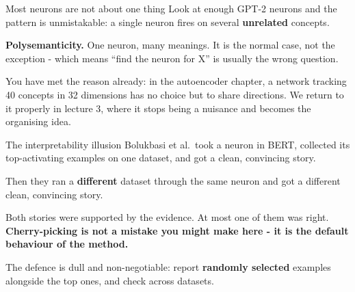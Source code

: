 \documentclass[aspectratio=169]{beamer}
\newcommand{\keybox}[1]{%
  \begin{tcolorbox}[colback=armblue!8, colframe=armblue, boxrule=0.6pt, arc=2pt]
  #1
  \end{tcolorbox}}
\newcommand{\trapbox}[1]{%
  \begin{tcolorbox}[colback=armred!8, colframe=armred, boxrule=0.6pt, arc=2pt]
  #1
  \end{tcolorbox}}
\begin{document}
\begin{frame}{Most neurons are not about one thing}
  \vspace{0.6em}
  Look at enough GPT-2 neurons and the pattern is unmistakable: a single neuron fires on
  several \textbf{unrelated} concepts.

  \vspace{0.8em}
  \keybox{\textbf{Polysemanticity.} One neuron, many meanings. It is the normal case, not the
  exception - which means ``find the neuron for X'' is usually the wrong question.}

  \vspace{0.9em}
  You have met the reason already: in the autoencoder chapter, a network tracking 40 concepts in
  32 dimensions has no choice but to share directions. We return to it properly in lecture 3,
  where it stops being a nuisance and becomes the organising idea.
\end{frame}

\begin{frame}{The interpretability illusion}
  \vspace{0.6em}
  Bolukbasi et al.\ took a neuron in BERT, collected its top-activating examples on one dataset,
  and got a clean, convincing story.

  \vspace{0.5em}
  Then they ran a \textbf{different} dataset through the same neuron and got a different clean,
  convincing story.

  \vspace{0.9em}
  \trapbox{Both stories were supported by the evidence. At most one of them was right.
  \textbf{Cherry-picking is not a mistake you might make here - it is the default behaviour of
  the method.}}

  \vspace{0.8em}
  The defence is dull and non-negotiable: report \textbf{randomly selected} examples alongside
  the top ones, and check across datasets.
\end{frame}
\end{document}
